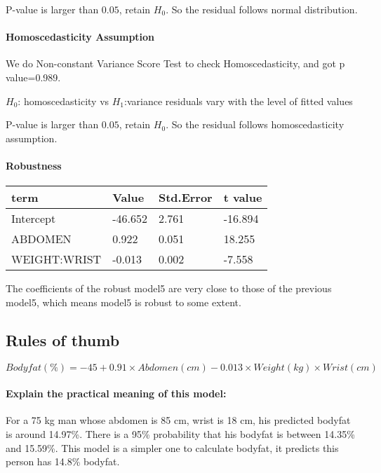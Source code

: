 \documentclass[11pt]{article}
\begin{document}
P-value is larger than \(0.05\), retain \(H_{0}\). So the residual
follows normal distribution.

    \paragraph{Homoscedasticity
Assumption}\label{homoscedasticity-assumption}

    We do Non-constant Variance Score Test to check Homoscedasticity, and
got p value=0.989.

\(H_{0}\): homoscedasticity vs \(H_{1}\):variance residuals vary with
the level of fitted values

P-value is larger than \(0.05\), retain \(H_{0}\). So the residual
follows homoscedasticity assumption.

    \paragraph{Robustness}\label{robustness}

    \begin{longtable}[]{@{}llll@{}}
\toprule
term & Value & Std.Error & t value\tabularnewline
\midrule
\endhead
Intercept & -46.652 & 2.761 & -16.894\tabularnewline
ABDOMEN & 0.922 & 0.051 & 18.255\tabularnewline
WEIGHT:WRIST & -0.013 & 0.002 & -7.558\tabularnewline
\bottomrule
\end{longtable}

    The coefficients of the robust model5 are very close to those of the
previous model5, which means model5 is robust to some extent.

    \subsection{Rules of thumb}\label{rules-of-thumb}

    \[ Bodyfat(\%) = -45 + 0.91\times Abdomen(cm) -0.013\times Weight(kg)\times Wrist(cm)\]

\paragraph{Explain the practical meaning of this
model:}\label{explain-the-practical-meaning-of-this-model}

For a 75 kg man whose abdomen is 85 cm, wrist is 18 cm, his predicted
bodyfat is around 14.97\%. There is a 95\% probability that his bodyfat
is between 14.35\% and 15.59\%. This model is a simpler one to calculate
bodyfat, it predicts this person has 14.8\% bodyfat.
\end{document}
